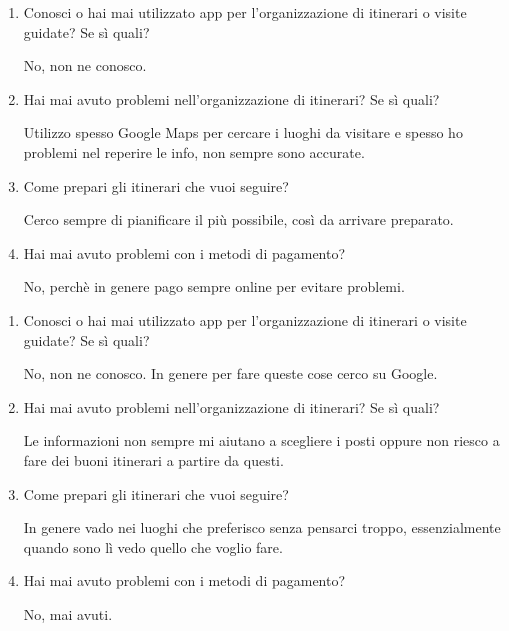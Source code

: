 \clearpage
{}

\begin{enumerate}

\item Conosci o hai mai utilizzato app per l'organizzazione di itinerari o visite guidate? Se sì quali?

No, non ne conosco.

\item Hai mai avuto problemi nell'organizzazione di itinerari? Se sì quali?

Utilizzo spesso Google Maps per cercare i luoghi da visitare e spesso ho problemi nel reperire le info, non sempre sono accurate.

\item Come prepari gli itinerari che vuoi seguire?

Cerco sempre di pianificare il più possibile, così da arrivare preparato.

\item Hai mai avuto problemi con i metodi di pagamento?

No, perchè in genere pago sempre online per evitare problemi.

\end{enumerate}

\clearpage
{}

\begin{enumerate}

\item Conosci o hai mai utilizzato app per l'organizzazione di itinerari o visite guidate? Se sì quali?

No, non ne conosco. In genere per fare queste cose cerco su Google.

\item Hai mai avuto problemi nell'organizzazione di itinerari? Se sì quali?

Le informazioni non sempre mi aiutano a scegliere i posti oppure non riesco a fare dei buoni itinerari a partire da questi.

\item Come prepari gli itinerari che vuoi seguire?

In genere vado nei luoghi che preferisco senza pensarci troppo, essenzialmente quando sono lì vedo quello che voglio fare.

\item Hai mai avuto problemi con i metodi di pagamento?

No, mai avuti.

\end{enumerate}

